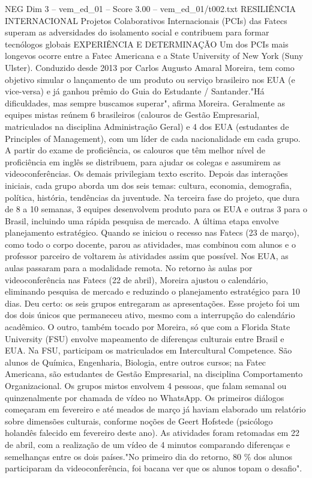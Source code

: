 \begin{textsample}{NEG Dim 3 – vem\_ed\_01 – Score 3.00 – vem\_ed\_01/t002.txt}  \label{ex:f3_neg_094}
RESILIÊNCIA INTERNACIONAL Projetos Colaborativos Internacionais (PCIs) das Fatecs superam as adversidades do isolamento social e contribuem para formar tecnólogos globais EXPERIÊNCIA E DETERMINAÇÃO Um dos PCIs mais longevos ocorre entre a Fatec Americana e a State University of New York (Suny Ulster).
Conduzido desde 2013 por Carlos Augusto Amaral Moreira, tem como objetivo simular o lançamento de um produto ou serviço brasileiro nos EUA (e vice-versa) e já ganhou prêmio do Guia do Estudante / Santander."Há dificuldades, mas sempre buscamos superar", afirma Moreira.
Geralmente as equipes mistas reúnem 6 brasileiros (calouros de Gestão Empresarial, matriculados na disciplina Administração Geral) e 4 dos EUA (estudantes de Principles of Management), com um líder de cada nacionalidade em cada grupo.
A partir do exame de proficiência, os calouros que têm melhor nível de proficiência em inglês se distribuem, para ajudar os colegas e assumirem as videoconferências.
Os demais privilegiam texto escrito.
Depois das interações iniciais, cada grupo aborda um dos seis temas: cultura, economia, demografia, política, história, tendências da juventude.
Na terceira fase do projeto, que dura de 8 a 10 semanas, 3 equipes desenvolvem produto para os EUA e outras 3 para o Brasil, incluindo uma rápida pesquisa de mercado.
A última etapa envolve planejamento estratégico.
Quando se iniciou o recesso nas Fatecs (23 de março), como todo o corpo docente, parou as atividades, mas combinou com alunos e o professor parceiro de voltarem às atividades assim que possível.
Nos EUA, as aulas passaram para a modalidade remota.
No retorno às aulas por videoconferência nas Fatecs (22 de abril), Moreira ajustou o calendário, eliminando pesquisa de mercado e reduzindo o planejamento estratégico para 10 dias.
Deu certo: os seis grupos entregaram as apresentações.
Esse projeto foi um dos dois únicos que permaneceu ativo, mesmo com a interrupção do calendário acadêmico.
O outro, também tocado por Moreira, só que com a Florida State University (FSU) envolve mapeamento de diferenças culturais entre Brasil e EUA.
Na FSU, participam os matriculados em Intercultural Competence.
São alunos de Química, Engenharia, Biologia, entre outros cursos; na Fatec Americana, são estudantes de Gestão Empresarial, na disciplina Comportamento Organizacional.
Os grupos mistos envolvem 4 pessoas, que falam semanal ou quinzenalmente por chamada de vídeo no WhatsApp.
Os primeiros diálogos começaram em fevereiro e até meados de março já haviam elaborado um relatório sobre dimensões culturais, conforme noções de Geert Hofstede (psicólogo holandês falecido em fevereiro deste ano).
As atividades foram retomadas em 22 de abril, com a realização de um vídeo de 4 minutos comparando diferenças e semelhanças entre os dois países."No primeiro dia do retorno, 80 \% dos alunos participaram da videoconferência, foi bacana ver que os alunos topam o desafio".

\end{textsample}
